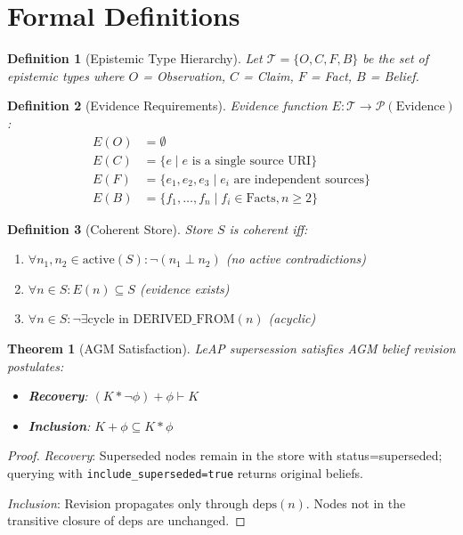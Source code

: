 \documentclass[11pt,letterpaper]{article}
\newtheorem{definition}{Definition}[section]
\newtheorem{theorem}{Theorem}[section]
\begin{document}
\appendix
\section{Formal Definitions}
\label{app:formal}

\begin{definition}[Epistemic Type Hierarchy]
\label{def:types}
Let $\mathcal{T} = \{O, C, F, B\}$ be the set of epistemic types where $O$ = Observation, $C$ = Claim, $F$ = Fact, $B$ = Belief.
\end{definition}

\begin{definition}[Evidence Requirements]
\label{def:evidence}
Evidence function $E: \mathcal{T} \to \mathcal{P}(\text{Evidence})$:
\begin{align*}
E(O) &= \emptyset \\
E(C) &= \{e \mid e \text{ is a single source URI}\} \\
E(F) &= \{e_1, e_2, e_3 \mid e_i \text{ are independent sources}\} \\
E(B) &= \{f_1, \ldots, f_n \mid f_i \in \text{Facts}, n \geq 2\}
\end{align*}
\end{definition}

\begin{definition}[Coherent Store]
\label{def:coherent}
Store $S$ is coherent iff:
\begin{enumerate}[noitemsep]
    \item $\forall n_1, n_2 \in \text{active}(S): \neg(n_1 \perp n_2)$ (no active contradictions)
    \item $\forall n \in S: E(n) \subseteq S$ (evidence exists)
    \item $\forall n \in S: \neg\exists \text{cycle in DERIVED\_FROM}(n)$ (acyclic)
\end{enumerate}
\end{definition}

\begin{theorem}[AGM Satisfaction]
\label{thm:agm}
LeAP supersession satisfies AGM belief revision postulates:
\begin{itemize}[noitemsep]
    \item \textbf{Recovery}: $(K * \neg\phi) + \phi \vdash K$
    \item \textbf{Inclusion}: $K + \phi \subseteq K * \phi$
\end{itemize}
\end{theorem}

\begin{proof}
\textit{Recovery}: Superseded nodes remain in the store with status=superseded; querying with \texttt{include\_superseded=true} returns original beliefs.

\textit{Inclusion}: Revision propagates only through $\text{deps}(n)$. Nodes not in the transitive closure of $\text{deps}$ are unchanged.
\end{proof}
\end{document}
